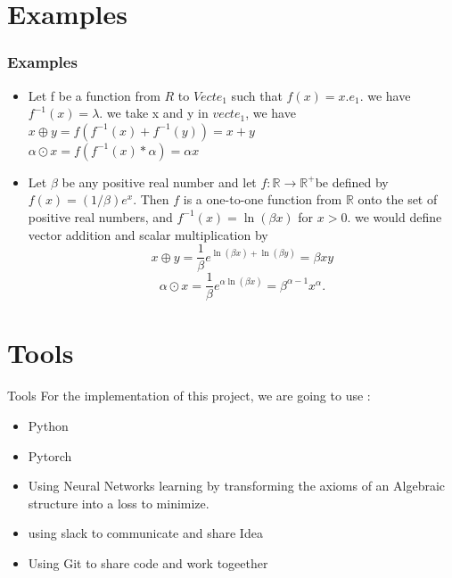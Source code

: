 \documentclass{beamer}
\begin{document}
    \section{Examples}
    \begin{frame}
        \frametitle{Examples}
        \begin{itemize}
            \item Let f be a function from $R$ to $Vect{e_1}$ such that $f(x) = x.e_1$.
            we have $f^{-1}(x) = \lambda$.
                we take x and y in $vect{e_1}$, we have \\
                $x\oplus y = f(f^{-1}(x) + f^{-1}(y)) = x + y$ \\
                $\alpha \odot x = f(f^{-1}(x) * \alpha) = \alpha x$
                \item Let $\beta$ be any positive real number and let $f: \mathbb{R} \rightarrow \mathbb{R}^{+}$be defined by $f(x)=(1 / \beta) e^x$. Then $f$ is a one-to-one function from $\mathbb{R}$ onto the set of positive real numbers, and $f^{-1}(x)=\ln (\beta x)$ for $x>0$. we would define vector addition and scalar multiplication by
                $$ 
                x \oplus y=\frac{1}{\beta} e^{\ln (\beta x)+\ln (\beta y)}=\beta x y
                $$
                $$
                \alpha \odot x=\frac{1}{\beta} e^{\alpha \ln (\beta x)}=\beta^{\alpha-1} x^\alpha.
                $$
            \end{itemize}
    \end{frame}


        \section{Tools}
        \begin{frame}{Tools}
            For the implementation of this project, we are going to use :
            \begin{itemize}
                \item Python
                \item Pytorch
                \item Using Neural Networks learning by transforming the axioms of
                an Algebraic structure into a loss to minimize.
                \item using slack to communicate and share Idea
                \item Using Git to share code and work togeether
            \end{itemize}
        \end{frame}
\end{document}
